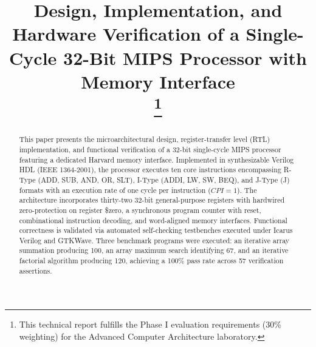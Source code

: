 \documentclass[conference]{IEEEtran}
\begin{document}
\title{Design, Implementation, and Hardware Verification of a Single-Cycle 32-Bit MIPS Processor with Memory Interface\\
\thanks{This technical report fulfills the Phase I evaluation requirements (30\% weighting) for the Advanced Computer Architecture laboratory.}
}

\author{
\and
{}
\and
{}
\and
{}
\and
{}
}

\maketitle

\begin{abstract}
This paper presents the microarchitectural design, register-transfer level (RTL) implementation, and functional verification of a 32-bit single-cycle MIPS processor featuring a dedicated Harvard memory interface. Implemented in synthesizable Verilog HDL (IEEE 1364-2001), the processor executes ten core instructions encompassing R-Type (ADD, SUB, AND, OR, SLT), I-Type (ADDI, LW, SW, BEQ), and J-Type (J) formats with an execution rate of one cycle per instruction ($CPI = 1$). The architecture incorporates thirty-two 32-bit general-purpose registers with hardwired zero-protection on register \$zero, a synchronous program counter with reset, combinational instruction decoding, and word-aligned memory interfaces. Functional correctness is validated via automated self-checking testbenches executed under Icarus Verilog and GTKWave. Three benchmark programs were executed: an iterative array summation producing 100, an array maximum search identifying 67, and an iterative factorial algorithm producing 120, achieving a 100\% pass rate across 57 verification assertions.
\end{abstract}
\end{document}

